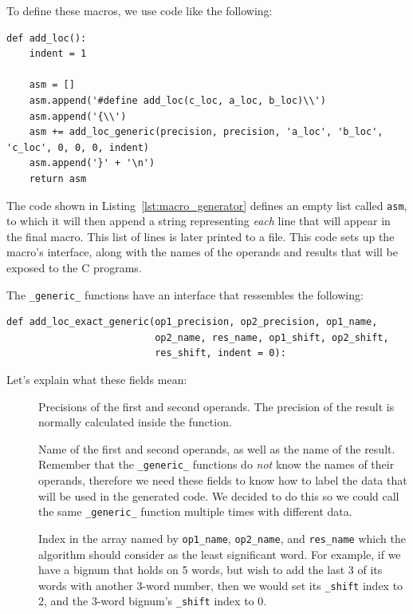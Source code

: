 \documentclass[12pt, a4paper]{report}
\begin{document}
\begin{sloppypar}
To define these macros, we use code like the following:
\begin{lstlisting}
def add_loc():
    indent = 1

    asm = []
    asm.append('#define add_loc(c_loc, a_loc, b_loc)\\')
    asm.append('{\\')
    asm += add_loc_generic(precision, precision, 'a_loc', 'b_loc', 'c_loc', 0, 0, 0, indent)
    asm.append('}' + '\n')
    return asm
\end{lstlisting}

The code shown in Listing~\ref{lst:macro_generator} defines an empty list called
\verb+asm+, to which it will then append a string representing \emph{each} line
that will appear in the final macro.
This list of lines is later printed to a file.
This code sets up the macro's interface, along with the names of the operands
and results that will be exposed to the C programs.

The \verb+_generic_+ functions have an interface that ressembles the following:
\begin{lstlisting}
def add_loc_exact_generic(op1_precision, op2_precision, op1_name,
                          op2_name, res_name, op1_shift, op2_shift,
                          res_shift, indent = 0):
\end{lstlisting}

Let's explain what these fields mean:
\begin{description}
\item[] Precisions of the first and second
operands. The precision of the result is normally calculated inside the
function.
\item[] Name of the first and second operands,
as well as the name of the result.
Remember that the \verb+_generic_+ functions do \emph{not} know the names of
their operands, therefore we need these fields to know how to label the data
that will be used in the generated code.
We decided to do this so we could call the same \verb+_generic_+ function
multiple times with different data.
\item[] Index in the array named by
\verb+op1_name+, \verb+op2_name+, and \verb+res_name+ which the
algorithm should consider as the least significant word.
For example, if we have a bignum that holds on 5 words, but wish to add the
last 3 of its words with another 3-word number, then we would set its
\verb+_shift+ index to 2, and the 3-word bignum's \verb+_shift+ index to 0.


\end{description}
\end{sloppypar}
\end{document}
